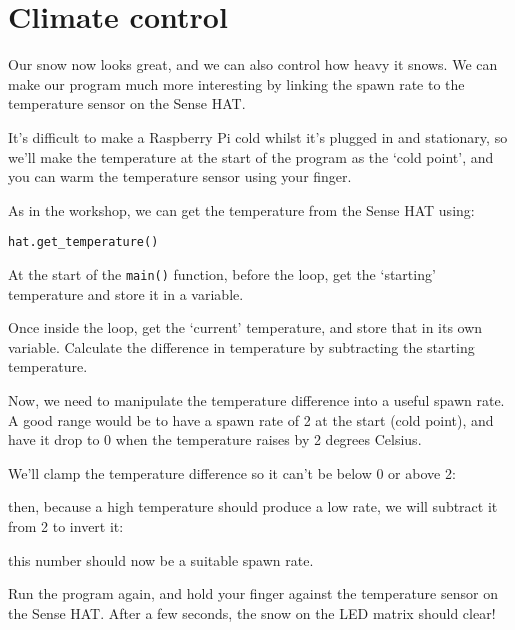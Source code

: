\section{Climate control}

Our snow now looks great, and we can also control how heavy it snows. We can make our program much more interesting by linking the spawn rate to the temperature sensor on the Sense HAT.

It's difficult to make a Raspberry Pi cold whilst it's plugged in and stationary, so we'll make the temperature at the start of the program as the `cold point', and you can warm the temperature sensor using your finger.

As in the workshop, we can get the temperature from the Sense HAT using:

\begin{lstlisting}[style=Python, numbers=none]
hat.get_temperature()
\end{lstlisting}

At the start of the \texttt{main()} function, before the loop, get the `starting' temperature and store it in a variable.



Once inside the loop, get the `current' temperature, and store that in its own variable. Calculate the difference in temperature by subtracting the starting temperature.



Now, we need to manipulate the temperature difference into a useful spawn rate. A good range would be to have a spawn rate of 2 at the start (cold point), and have it drop to 0 when the temperature raises by 2 degrees Celsius.

We'll clamp the temperature difference so it can't be below 0 or above 2:



then, because a high temperature should produce a low rate, we will subtract it from 2 to invert it:



this number should now be a suitable spawn rate.



Run the program again, and hold your finger against the temperature sensor on the Sense HAT. After a few seconds, the snow on the LED matrix should clear!